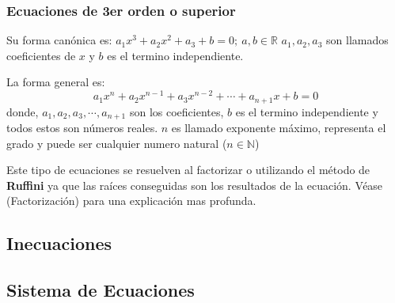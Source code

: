    \subsubsection{Ecuaciones de 3er orden o superior} \label{Ecuaciones-de-3er-orden-o-superior}
    Su forma canónica es: $a_1x^3+a_2x^2+a_3+b=0;\ a,b\in\mathbb{R}$ $a_1,a_2,a_3$ son
    llamados coeficientes  de $x$ y $b$ es el termino independiente.

    La forma general es:
    $$a_1x^n+a_2x^{n-1}+a_3x^{n-2}+\cdots+a_{n+1}x+b = 0$$
    donde, $a_1,a_2,a_3,\cdots,a_{n+1}$ son los coeficientes, $b$ es el termino
    independiente y todos estos son números reales. $n$ es llamado exponente máximo,
    representa el grado y puede ser cualquier numero natural ($n \in \mathbb{N}$)


    Este tipo de ecuaciones se resuelven al factorizar o utilizando el método
    de \textbf{Ruffini} ya que las raíces conseguidas son los resultados de la
    ecuación. Véase (\refname{Factorización}) para una explicación mas profunda.



\subsection{Inecuaciones}




\subsection{Sistema de Ecuaciones}
